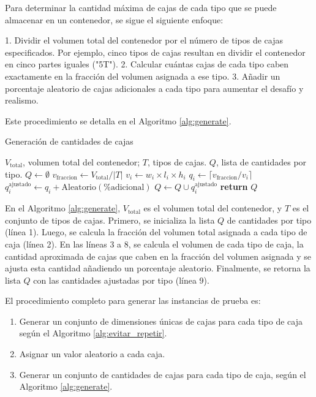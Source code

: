 \documentclass[openany]{article}
\begin{document}
Para determinar la cantidad máxima de cajas de cada tipo que se puede almacenar en un contenedor, se sigue el siguiente enfoque:

1. Dividir el volumen total del contenedor por el número de tipos de cajas especificados. Por ejemplo, cinco tipos de cajas resultan en dividir el contenedor en cinco partes iguales ("5T").
2. Calcular cuántas cajas de cada tipo caben exactamente en la fracción del volumen asignada a ese tipo.
3. Añadir un porcentaje aleatorio de cajas adicionales a cada tipo para aumentar el desafío y realismo.

Este procedimiento se detalla en el Algoritmo \ref{alg:generate}.

\begin{algorithm}[H]
    \caption{Generación de cantidades de cajas}
    \label{alg:generate}
    \begin{algorithmic}[1]
        \Require $V_{\text{total}}$, volumen total del contenedor; $T$, tipos de cajas.
        \Ensure $Q$, lista de cantidades por tipo.
        \State $Q \gets \emptyset$
        \State $v_{\text{fraccion}} \gets V_{\text{total}} / |T|$ 
        \State $v_i \gets w_i \times l_i \times h_i$ 
        \State $q_i \gets \lceil v_{\text{fraccion}} / v_i \rceil$
        \State $q_i^{\text{ajustado}} \gets q_i + \text{Aleatorio}(\% \text{adicional})$ 
        \State $Q \gets Q \cup q_i^{\text{ajustado}}$
        \EndFor
        \State \textbf{return} $Q$
    \end{algorithmic}
\end{algorithm}

En el Algoritmo \ref{alg:generate}, $V_{\text{total}}$ es el volumen total del contenedor, y $T$ es el conjunto de tipos de cajas. Primero, se inicializa la lista $Q$ de cantidades por tipo (línea 1). Luego, se calcula la fracción del volumen total asignada a cada tipo de caja (línea 2). En las líneas 3 a 8, se calcula el volumen de cada tipo de caja, la cantidad aproximada de cajas que caben en la fracción del volumen asignada y se ajusta esta cantidad añadiendo un porcentaje aleatorio. Finalmente, se retorna la lista $Q$ con las cantidades ajustadas por tipo (línea 9).

El procedimiento completo para generar las instancias de prueba es:

\begin{enumerate}
    \item Generar un conjunto de dimensiones únicas de cajas para cada tipo de caja según el Algoritmo \ref{alg:evitar_repetir}.
    \item Asignar un valor aleatorio a cada caja.
    \item Generar un conjunto de cantidades de cajas para cada tipo de caja, según el Algoritmo \ref{alg:generate}.
\end{enumerate}
\end{document}
